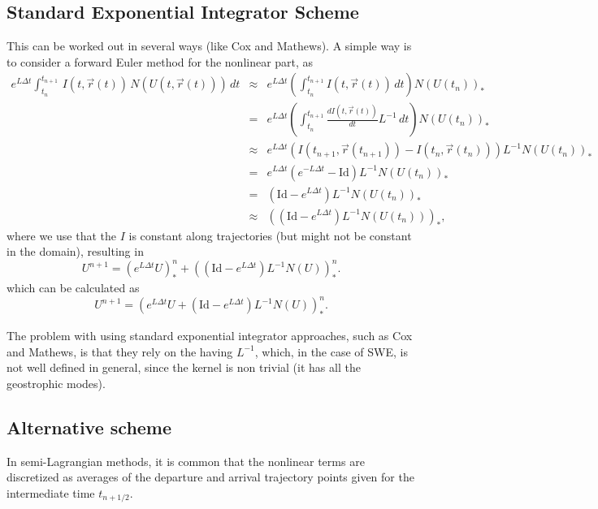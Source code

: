 \documentclass[10pt,a4paper]{article}
\begin{document}
\subsection{Standard Exponential Integrator Scheme}
This can be worked out in several ways (like Cox and Mathews). A simple way is to consider a forward Euler method for the nonlinear part, as 
\begin{eqnarray*}
e^{L\Delta t}\int_{t_n}^{t_{n+1}} \, I(t, \vec{r}(t))\, N(U(t, \vec{r}(t)))\,dt &\approx & 
e^{L\Delta t} \left( \int_{t_n}^{t_{n+1}}  I(t, \vec{r}(t))\,dt \right) N(U(t_n))_*\\
&= & 
e^{L\Delta t} \left( \int_{t_n}^{t_{n+1}} \frac{d I(t, \vec{r}(t))}{dt}L^{-1}\,dt \right) N(U(t_n))_*\\
&\approx & 
e^{L\Delta t} \left(  I(t_{n+1}, \vec{r}(t_{n+1}))- I(t_{n}, \vec{r}(t_{n})) \right) L^{-1} N(U(t_n))_*\\
&= & 
e^{L\Delta t} \left( e^{-L\Delta t} - \text{Id} \right) L^{-1} N(U(t_n))_*\\
&= & 
 \left(   \text{Id} - e^{L\Delta t}\right) L^{-1} N(U(t_n))_*\\
&\approx & 
 \left(\left(   \text{Id} - e^{L\Delta t}\right) L^{-1} N(U(t_n))\right)_*,
\end{eqnarray*}
where we use that the $I$ is constant along trajectories (but might not be constant in the domain), resulting in 
\begin{equation}
U^{n+1}=(e^{L \Delta t} U)^{n}_{*}+\left(\left(   \text{Id} - e^{L\Delta t}\right) L^{-1} N(U)\right)^{n}_*.
\end{equation}
which can be calculated as
\begin{equation}
U^{n+1}=\left(e^{L \Delta t} U+\left(   \text{Id} - e^{L\Delta t}\right) L^{-1} N(U)\right)^{n}_*.
\end{equation}

The problem with using standard exponential integrator approaches, such as Cox and Mathews, is that they rely on the having $L^{-1}$, which, in the case of SWE, is not well defined in general, since the kernel is non trivial (it has all the geostrophic modes).


\subsection{Alternative scheme}

In semi-Lagrangian methods, it is common that the nonlinear terms are discretized as averages of the departure and arrival trajectory points given for the intermediate time $t_{n+1/2}$.
\end{document}
